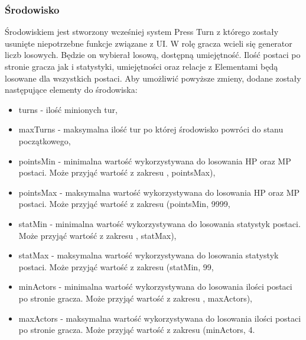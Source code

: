 \documentclass{SGGW-thesis}
\begin{document}
\subsubsection{Środowisko}
Środowiskiem jest stworzony wcześniej system Press Turn z którego zostały usunięte niepotrzebne funkcje związane z UI. W rolę gracza wcieli się generator liczb losowych. Będzie on wybierał losową, dostępną umiejętność.
Ilość postaci po stronie gracza jak i statystyki, umiejętności oraz relacje z Elementami będą losowane dla wszystkich postaci. Aby umożliwić powyższe zmieny, dodane zostały następujące elementy do środowiska:
\begin{itemize}
  \label{randomvals}
  \item{turns - ilość minionych tur},
  \item{maxTurns - maksymalna ilość tur po której środowisko powróci do stanu początkowego},
  \item{pointsMin - minimalna wartość wykorzystywana do losowania HP oraz MP postaci. Może przyjąć wartość z zakresu , pointsMax)},
  \item{pointsMax - maksymalna wartość wykorzystywana do losowania HP oraz MP postaci. Może przyjąć wartość z zakresu (pointsMin, 9999\textrangle},
  \item{statMin - minimalna wartość wykorzystywana do losowania statystyk postaci. Może przyjąć wartość z zakresu , statMax)},
  \item{statMax - maksymalna wartość wykorzystywana do losowania statystyk postaci. Może przyjąć wartość z zakresu (statMin, 99\textrangle},
  \item{minActors - minimalna wartość wykorzystywana do losowania ilości postaci po stronie gracza. Może przyjąć wartość z zakresu , maxActors)},
  \item{maxActors - maksymalna wartość wykorzystywana do losowania ilości postaci po stronie gracza. Może przyjąć wartość z zakresu (minActors, 4\textrangle}.
\end{itemize}
\end{document}
